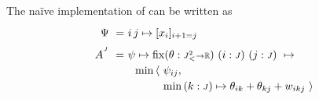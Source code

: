 \newenvironment{tacticboxInline}[1]{\begin{tabular}{|@{~~~}l@{~~~}|}\hline
    \rule{0pt}{2.3ex}\underline{\sf \,#1\,}\\[.4em]$}
  {$\\[-1em] \\[.3ex] \hline \end{tabular}}

\newcommand\vtyped[2]{\underset{\scriptscriptstyle ( #2 )}{ #1 }}
\newcommand\htyped[2]{({#1} : {\scriptstyle{#2}})}
\newcommand\htypednp[2]{{#1} : {\scriptstyle{#2}}}

\makeatletter
\newcommand{\quadrants@normal}[4]{
  \renewcommand\arraystretch{1.5}
   \begin{array}{c|c}
     #1 & #2 \\ \hline
     #3 & #4
   \end{array}}
\newcommand{\quadrants@small}[4]{
  \renewcommand\arraystretch{0.9}
   \begin{array}{@{~}c@{~}|@{~}c@{~}}
     \scriptstyle #1 & \scriptstyle #2 \\ \hline
     \scriptstyle #3 & \scriptstyle #4
   \end{array}}
\newcommand\quadrants{\@ifstar\quadrants@small\quadrants@normal}
\makeatother


\exampleTitle

\noindent
The na\"ive implementation of 
can be written as
%
\newcommand\Jsquaredltsml{J^2_{\mbox{\fontsize{6}{6}\selectfont \hspace{.5pt}<}}}
\begin{equation}
  \renewcommand\arraystretch{1.2}
  \begin{array}{@{}r@{}l@{}}
    \Psi ~=~ & i\,j\mapsto
	           [x_i]_{i+1=j} \\[2mm]
%
    A^{^{J}} ~=~ 
	      & \psi\mapsto \fix 
	        \htyped{\theta}{\Jsquaredltsml\to\R}~ \htyped{i}{J} ~ \htyped{j}{J}
	        ~\mapsto \\
	      &
          ~~
	      \begin{array}{@{}l@{}l@{}} 
	        \min\,\langle~ & \psi_{ij}, \\
	         & \min\, \htyped k J \mapsto\theta_{ik}+\theta_{kj}+w_{ikj}
	        ~\rangle
	      \end{array}
  \end{array}
  \label{tactics:paren phase A}
\end{equation}

